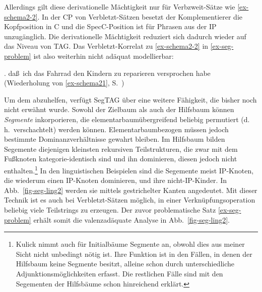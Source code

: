 \noindent Allerdings gilt diese derivationelle Mächtigkeit nur für Verbzweit-Sätze wie \ref{ex-schema2-2}. In der CP von Verbletzt-Sätzen besetzt der Komplementierer die Kopfposition in C und die SpecC-Position ist für Phrasen aus der IP unzugänglich. Die derivationelle Mächtigkeit reduziert sich dadurch wieder auf das Niveau von TAG. Das Verbletzt-Korrelat zu \ref{ex-schema2-2} in \ref{ex-seg-problem}  ist also weiterhin nicht adäquat modellierbar: 

\ex. da\ss \ ich das Fahrrad den Kindern zu reparieren versprochen habe\label{ex-seg-problem} \\ (Wiederholung von \ref{ex-schema21}, S.~\pageref{ex-schema21})

Um dem abzuhelfen, verfügt SegTAG über eine weitere Fähigkeit, die bisher noch nicht erwähnt wurde. Sowohl der Zielbaum als auch der Hilfsbaum können {\it Segmente} inkorporieren, die elementarbaumübergreifend beliebig permutiert (d.\,h.\ verschachtelt) werden können. Elementarbaumbezogen müssen jedoch bestimmte Dominanzverhältnisse gewahrt bleiben. Im Hilfsbaum bilden Segemente diejenigen kleinsten rekursiven Teilstrukturen, die zwar mit dem Fu\ss knoten kategorie-identisch sind und ihn dominieren, diesen jedoch nicht enthalten.\footnote{Kulick nimmt auch für Initialbäume Segmente an, obwohl dies aus meiner Sicht nicht unbedingt nötig ist. Ihre Funktion ist in den Fällen, in denen der Hilfsbaum keine Segmente besitzt, alleine schon durch unterschiedliche Adjunktionsmöglichkeiten erfasst. Die restlichen Fälle sind mit den Segementen der Hilfsbäume schon hinreichend erklärt.} In den linguistischen Beispielen sind die Segemente meist IP-Knoten, die wiederum einen IP-Knoten dominieren, und ihre nicht-IP-Kinder. In Abb.~\ref{fig-seg-ling2} werden sie mittels gestrichelter Kanten angedeutet. Mit dieser Technik ist es auch bei Verbletzt-Sätzen möglich, in einer Verknüpfungsoperation beliebig viele Teilstrings zu erzeugen. Der zuvor problematische Satz \ref{ex-seg-problem} erhält somit die valenzadäquate Analyse in Abb.~\ref{fig-seg-ling2}.      

